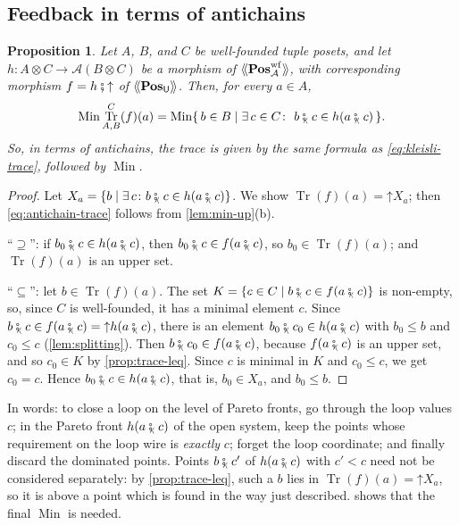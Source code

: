 \documentclass[11pt,a4paper]{article}
\theoremstyle{plain}
\newtheorem{proposition}[theorem]{Proposition}
\theoremstyle{definition}
\theoremstyle{remark}
\newcommand{\Cat}[1]{\mathbf{#1}}
\newcommand{\Pos}{\Cat{Pos}}
\newcommand{\U}{\mathsf{U}}
\newcommand{\An}{\mathcal{A}}
\newcommand{\PosU}{\Pos_{\U}}
\newcommand{\PosA}{\Pos^{\mathrm{wf}}_{\An}}
\providecommand{\llangle}{\mathopen{\langle\mkern-3.5mu\langle}}
\providecommand{\rrangle}{\mathclose{\rangle\mkern-3.5mu\rangle}}
\newcommand{\tL}[1]{\llangle #1 \rrangle}
\newcommand{\then}{\mathbin{\fatsemi}}
\newcommand{\tc}{\mathbin{\fatsemi_{\!\scriptscriptstyle\langle}}}
\newcommand{\up}{\mathord{\uparrow}}
\DeclareMathOperator{\Min}{Min}
\DeclareMathOperator{\Tr}{Tr}
\begin{document}
\subsection{Feedback in terms of antichains}

\begin{proposition}
    \label{prop:trace-antichains}
    Let $A$, $B$, and $C$ be well-founded tuple posets, and let $h \colon A \otimes C \to \An(B \otimes C)$ be a morphism of $\tL{\PosA}$, with corresponding morphism $f = h \then \up$ of $\tL{\PosU}$.
    Then, for every $a \in A$,
    \begin{equation}
        \label{eq:antichain-trace}
        \Min \Tr^{C}_{A,B}(f)(a) = \Min \{\, b \in B \mid \exists\, c \in C \colon\ b \tc c \in h(a \tc c) \,\}.
    \end{equation}
    So, in terms of antichains, the trace is given by the same formula as \cref{eq:kleisli-trace}, followed by $\Min$.
\end{proposition}
\begin{proof}
    Let $X_a = \{ b \mid \exists\, c \colon b \tc c \in h(a \tc c) \}$.
    We show $\Tr(f)(a) = \up X_a$; then \cref{eq:antichain-trace} follows from \cref{lem:min-up}(b).

    ``$\supseteq$'': if $b_0 \tc c \in h(a \tc c)$, then $b_0 \tc c \in f(a \tc c)$, so $b_0 \in \Tr(f)(a)$; and $\Tr(f)(a)$ is an upper set.

    ``$\subseteq$'': let $b \in \Tr(f)(a)$.
    The set $K = \{ c \in C \mid b \tc c \in f(a \tc c) \}$ is non-empty, so, since $C$ is well-founded, it has a minimal element $c$.
    Since $b \tc c \in f(a \tc c) = \up h(a \tc c)$, there is an element $b_0 \tc c_0 \in h(a \tc c)$ with $b_0 \leq b$ and $c_0 \leq c$ (\cref{lem:splitting}).
    Then $b \tc c_0 \in f(a \tc c)$, because $f(a \tc c)$ is an upper set, and so $c_0 \in K$ by \cref{prop:trace-leq}.
    Since $c$ is minimal in $K$ and $c_0 \leq c$, we get $c_0 = c$.
    Hence $b_0 \tc c \in h(a \tc c)$, that is, $b_0 \in X_a$, and $b_0 \leq b$.
\end{proof}

In words: to close a loop on the level of Pareto fronts, go through the loop values $c$; in the Pareto front $h(a \tc c)$ of the open system, keep the points whose requirement on the loop wire is \emph{exactly} $c$; forget the loop coordinate; and finally discard the dominated points.
Points $b \tc c'$ of $h(a \tc c)$ with $c' < c$ need not be considered separately: by \cref{prop:trace-leq}, such a $b$ lies in $\Tr(f)(a) = \up X_a$, so it is above a point which is found in the way just described.
 shows that the final $\Min$ is needed.
\end{document}
